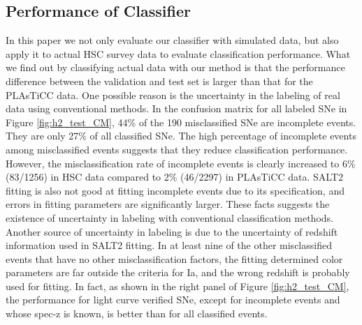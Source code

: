 \documentclass[useamsfonts]{pasj01}
\begin{document}
\subsection{Performance of Classifier}
%
In this paper we not only evaluate our classifier with simulated data, but also apply it to actual HSC survey data to evaluate classification performance.
What we find out by classifying actual data with our method is that the performance difference between the validation and test set is larger than that for the PLAsTiCC data.
One possible reason is the uncertainty in the labeling of real data using conventional methods.
In the confusion matrix for all labeled SNe in Figure \ref{fig:h2_test_CM}, 44\% of the 190 misclassified SNe are incomplete events.
They are only 27\% of all classified SNe.
The high percentage of incomplete events among misclassified events suggests that they reduce classification performance. %
However, the misclassification rate of incomplete events is clearly increased to 6\% (83/1256) in HSC data compared to 2\% (46/2297) in PLAsTiCC data.
SALT2 fitting is also not good at fitting incomplete events due to its specification, and errors in fitting parameters are significantly larger.
These facts suggests the existence of uncertainty in labeling with conventional classification methods.
Another source of uncertainty in labeling is due to the uncertainty of redshift information used in SALT2 fitting.
In at least nine of the other misclassified events that have no other misclassification factors, the fitting determined color parameters are far outside the criteria for Ia, and the wrong redshift is probably used for fitting.
In fact, as shown in the right panel of Figure \ref{fig:h2_test_CM}, the performance for light curve verified SNe, except for incomplete events and whose spec-z is known, is better than for all classified events.
\end{document}
